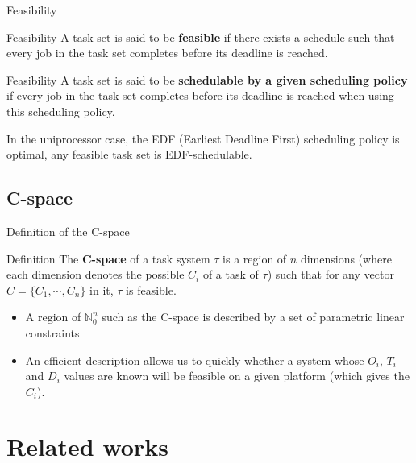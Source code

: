 \documentclass{beamer}
\begin{document}
	\begin{frame}{Feasibility}
		\begin{block}{Feasibility}
        A task set is said to be \textbf{feasible} if there exists a schedule such that every job in the task set completes before its deadline is reached.
        \end{block}

        \begin{block}{Feasibility}
        A task set is said to be \textbf{schedulable by a given scheduling policy} if every job in the task set completes before its deadline is reached when using this scheduling policy.
        \end{block}

        In the uniprocessor case, the EDF (Earliest Deadline First) scheduling policy is optimal, any feasible task set is EDF-schedulable.
	\end{frame}

    \subsection{C-space}

    \begin{frame}{Definition of the C-space}
        \begin{block}{Definition}
            The \textbf{C-space} of a task system $\tau$ is a region of $n$ dimensions (where each dimension denotes the possible $C_i$ of a task of $\tau$) such that for any vector $C = \{ C_1, \cdots, C_{n}\}$ in it, $\tau$ is feasible.
        \end{block}

        \begin{itemize}
            \item A region of $\mathbb{N}_0^n$ such as the C-space is described by a set of parametric linear constraints
            \item An efficient description allows us to quickly  whether a system whose $O_i$, $T_i$ and $D_i$ values are known will be feasible on a given platform (which gives the $C_i$).
        \end{itemize}

    \end{frame}

	\section{Related works}

    \begin{frame}
    \end{frame}
\end{document}

